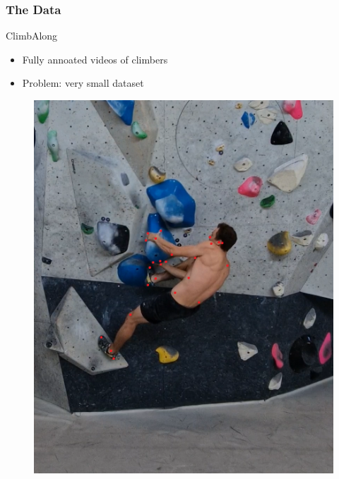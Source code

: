 \documentclass{beamer}
\begin{document}
\begin{frame}
    \frametitle{The Data}
    \begin{minipage}{0.5\textwidth}
        ClimbAlong
        \begin{itemize}
            \item Fully annoated videos of climbers
            \item<2-> Problem: very small dataset
        \end{itemize}
    \end{minipage} \hfill
    \begin{minipage}{0.45\textwidth}
        \begin{figure}
            \center
            \includegraphics[width = \textwidth]{./entities/ClimbAlong_cv_2.PNG}
        \end{figure}
    \end{minipage}
\end{frame}
\end{document}
